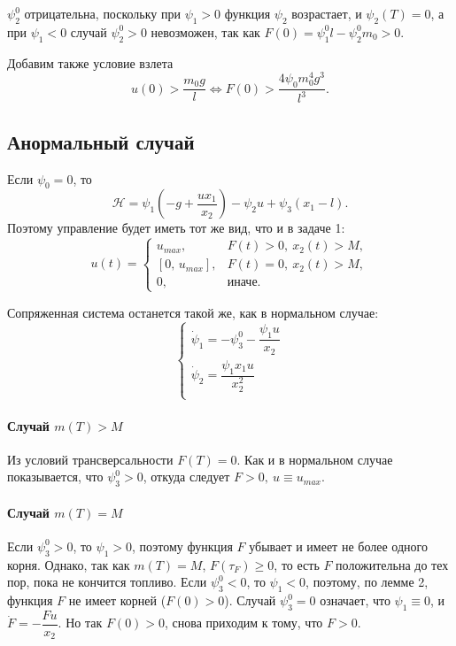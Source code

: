 \documentclass[16pt]{article}
\begin{document}
$\psi_2^0$ отрицательна, поскольку при $\psi_1 > 0$ функция $\psi_2$ возрастает, и $\psi_2(T) = 0$, а при
$\psi_1 < 0$ случай $\psi_2^0 > 0$ невозможен, так как $F(0) = \psi_1^0l - \psi_2^0m_0 > 0$.

Добавим также условие взлета
$$u(0) > \dfrac{m_0g}{l} \Leftrightarrow F(0) > \dfrac{4\psi_0m_0^4g^3}{l^3} .$$
\subsection{Анормальный случай}
Если $\psi_0 = 0$, то
$$\mathcal{H} = \psi_1\left(-g + \dfrac{ux_1}{x_2}\right) - \psi_2u + \psi_3(x_1-l).$$
Поэтому управление будет иметь тот же вид, что и в задаче 1:
 \begin{equation} \label{oc_1}
 u(t) = 
 \begin{cases}
 u_{max}, & F(t) > 0,\  x_2(t) > M, \\
 [0,\, u_{max}], & F(t) = 0, \ x_2(t) > M, \\
 0, &\text{иначе.}
 \end{cases}
 \end{equation}

Сопряженная система останется такой же, как в нормальном случае:
\begin{equation}
\begin{cases} 
\dot{\psi}_1 = -\psi_3^0 -\dfrac{\psi_1u}{x_2}\\
\dot{\psi}_2 = \dfrac{\psi_1 x_1 u}{x_2^2} \\
\end{cases}
\end{equation}

\paragraph{Случай $m(T) > M$}
Из условий трансверсальности $F(T) = 0$. Как и в нормальном случае показывается, что $\psi_3^0 > 0$, откуда следует
$F > 0, \ u \equiv u_{max}$.

\paragraph{Случай $m(T) = M$}
Если $\psi_3^0 > 0$, то $\psi_1 > 0$, поэтому функция $F$ убывает и имеет не более одного корня. Однако, так как 
$m(T) = M$, $F(\tau_F) \geqslant 0$, то есть $F$ положительна до тех пор, пока не кончится топливо. Если 
$\psi_3^0 < 0$, то $\psi_1 < 0$, поэтому, по лемме 2, функция $F$ не имеет корней ($F(0) > 0$). Случай $\psi_3^0 = 0$
означает, что $\psi_1 \equiv 0$, и $\dot{F} = -\dfrac{Fu}{x_2}$. Но так $F(0) > 0$, снова приходим к тому, 
что $F > 0$.
\end{document}
